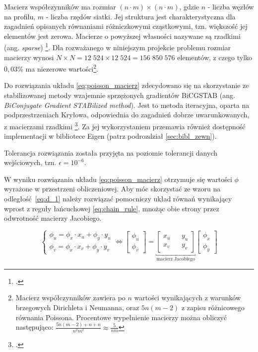 \indent Macierz współczynników ma rozmiar $(n\cdot m)\times (n\cdot m)$, gdzie $n$ - liczba węzłów na profilu, $m$ - liczba rzędów siatki. Jej struktura jest charakterystyczna dla zagadnień opisanych równaniami różniczkowymi cząstkowymi, tzn. większość jej elementów jest  zerowa. Macierze o powyższej własności nazywane są rzadkimi (ang. \textit{sparse}) \footcite{Saad,s. 67}. Dla rozważanego w niniejszym projekcie problemu rozmiar macierzy wynosi $N\times N = 12\;524\times 12\;524 = 156\;850\;576$ elementów, z czego tylko $0{,}03\%$ ma niezerowe wartości\footnote{Macierz współczynników zawiera po $n$ wartości wynikających z warunków brzegowych Dirichleta i Neumanna, oraz $5n(m-2)$ z zapisu różnicowego równania Poissona. Procentowe wypełnienie macierzy można obliczyć następująco: $\frac{5n(m-2)+n+n}{n^2m^2}\approx\frac{5}{nm}$}. 

\indent Do rozwiązania układu \ref{eq:poisson_macierz} zdecydowano się na skorzystanie ze stabilizowanej metody wzajemnie sprzężonych gradientów BiCGSTAB (ang. \textit{BiConjugate Gradient STABilized method}). Jest to metoda iteracyjna, oparta na podprzestrzeniach Kryłowa, odpowiednia do zagadnień dobrze uwarunkowanych, z macierzami rzadkimi \footcite{Blazek,s. 208}. Za jej wykorzystaniem przemawia również dostępność implementacji w bibliotece Eigen (patrz podrozdział \ref{sec:bibl_zewn}).

\noindent Tolerancja rozwiązania została przyjęta na poziomie tolerancji danych wejściowych, tzn. $\epsilon = 10^{-6}$.




\indent W wyniku rozwiązania układu \ref{eq:poisson_macierz} otrzymuje się wartości $\phi$ wyrażone w przestrzeni obliczeniowej. Aby móc skorzystać ze wzoru na odległość~\ref{eq:d_1} należy rozwiązać pomocniczy układ równań wynikający wprost z reguły łańcuchowej \ref{eq:chain_rule}, mnożąc obie strony przez odwrotność macierzy Jacobiego.

\begin{equation}
\begin{cases}
	\phi_u = \phi_x\cdot x_u + \phi_y\cdot y_u \\
	\phi_v = \phi_x\cdot x_v + \phi_y\cdot y_v
\end{cases} \iff
\begin{bmatrix}
\phi_u \\ \phi_v
\end{bmatrix}=
\underbracket{\begin{bmatrix}
x_u && y_u \\
x_v && y_v
\end{bmatrix}}_{\text{macierz Jacobiego}}
\begin{bmatrix}
\phi_x \\ \phi_y
\end{bmatrix}
\label{eq:chain_rule}
\end{equation}

